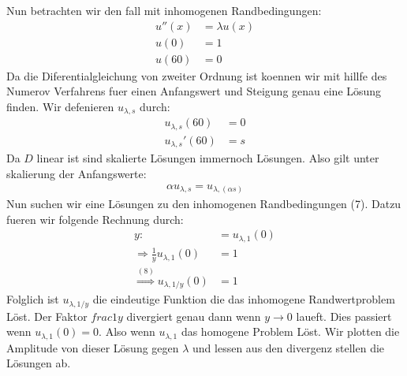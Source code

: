 \documentclass[ngerman]{scrartcl}
\begin{document}
	Nun betrachten wir den fall mit inhomogenen Randbedingungen:
	\begin{align}
		u''(x) &= \lambda u(x)\\
		u(0) &= 1\nonumber\\
		u(60) &= 0\nonumber
	\end{align}
	Da die Diferentialgleichung von zweiter Ordnung ist koennen wir mit hillfe des Numerov Verfahrens fuer einen Anfangswert und Steigung genau eine Lösung finden. Wir defenieren $u_{\lambda,s}$ durch:
	\begin{align*}
		u_{\lambda,s}(60)&=0\\
		u_{\lambda,s}'(60)&=s
	\end{align*}
	Da $D$ linear ist sind skalierte Lösungen immernoch Lösungen. Also gilt unter skalierung der Anfangswerte: 
	\begin{align}
		\alpha u_{\lambda,s}=u_{\lambda,(\alpha s)}
	\end{align}
	Nun suchen wir eine Lösungen zu den inhomogenen Randbedingungen (7). Datzu fueren wir folgende Rechnung durch:
	\begin{align*}
		y:&=u_{\lambda,1}(0)\\
		\Rightarrow \frac{1}{y}u_{\lambda,1}(0)&=1\\
		\overset{(8)}{\Rightarrow}u_{\lambda,1/y}(0)&=1
	\end{align*}
	Folglich ist $u_{\lambda,1/y}$ die eindeutige Funktion die das inhomogene Randwertproblem Löst.
	Der Faktor $frac{1}{y}$ divergiert genau dann wenn $y \rightarrow 0$ laueft.
	Dies passiert wenn $u_{\lambda,1}(0)=0$. Also wenn $u_{\lambda,1}$ das homogene Problem Löst.
	Wir plotten die Amplitude von dieser Lösung gegen $\lambda$ und lessen aus den divergenz stellen die Lösungen ab.
	\newpage
\end{document}
